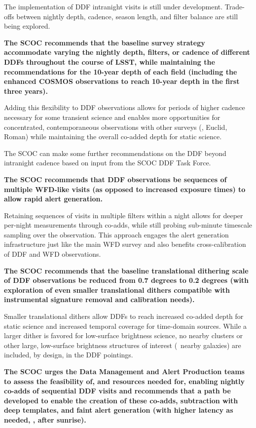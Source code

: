 The implementation of DDF intranight visits is still under development. Trade-offs between nightly depth, cadence, season length, and filter balance are still being explored.

{\bf The SCOC recommends that the baseline survey strategy accommodate varying the nightly depth, filters, or cadence of different DDFs throughout the course of LSST, while maintaining the  recommendations for the 10-year depth of each field (including the enhanced COSMOS observations to reach 10-year depth in the first three years).}

Adding this flexibility to DDF observations allows for periods of higher cadence necessary for some transient science \citep[\eg, AGN or supernovae;][]{Yu:2020,Kovacevic:2022,Czerny:2023,PozoNunez:2024,Gris:2023,Gris:2024} and enables more opportunities for concentrated, contemporaneous observations with other surveys (\eg , Euclid, Roman) while maintaining the overall co-added depth for static science.

The SCOC can make some further recommendations on the DDF beyond intranight cadence based on input from the SCOC DDF Task Force.

{\bf The SCOC recommends that DDF observations be sequences of multiple WFD-like visits (as opposed to increased exposure times) to allow rapid alert generation.} 

Retaining sequences of visits in multiple filters within a night allows for deeper per-night measurements through co-adds, while still probing sub-minute timescale sampling over the observation. This approach engages the alert generation infrastructure just like the main WFD survey and also benefits cross-calibration of DDF and WFD observations. 

{\bf The SCOC recommends that the baseline translational dithering scale of DDF observations be reduced from 0.7 degrees to 0.2 degrees (with exploration of even smaller translational dithers compatible with instrumental signature removal and calibration needs).
}

Smaller translational dithers allow DDFs to reach increased co-added depth for static science and increased temporal coverage for time-domain sources. While a larger dither is favored for low-surface brightness science, no nearby clusters or other large, low-surface brightness structures of interest (\eg\, nearby galaxies) are included, by design, in the DDF pointings.



{\bf The SCOC urges the Data Management and Alert Production teams to assess the feasibility of, and resources needed for, enabling nightly co-adds of sequential DDF visits and recommends that a path be developed to enable the creation of these co-adds, subtraction with deep templates, and faint alert generation (with higher latency as needed, \eg , after sunrise). 
}

